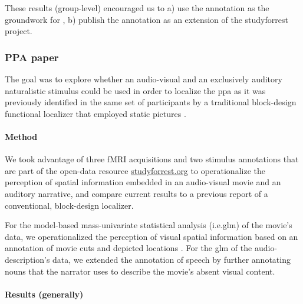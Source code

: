 These results (group-level) encouraged us to a) use the annotation as the
groundwork for \citep{haeusler2022processing}, b) publish the annotation as an
extension of the studyforrest project.


\subsubsection{PPA paper}




The goal \citep{haeusler2022processing} was to explore whether an
audio-visual and an exclusively auditory naturalistic stimulus could be used in
order to localize the \ac{ppa} as it was previously identified in the same set
of participants by a traditional block-design functional localizer that employed
static pictures \citep{sengupta2016extension}.



\paragraph{Method}

We took advantage of three fMRI acquisitions and two stimulus annotations that
are part of the open-data resource
\href{http://www.studyforrest.org}{studyforrest.org} to operationalize the
perception of spatial information embedded in an audio-visual movie and an
auditory narrative, and compare current results to a previous report of a
conventional, block-design localizer.


For the model-based mass-univariate statistical analysis (i.e.\ac{glm}) of the
movie's data, we operationalized the perception of visual spatial information
based on an annotation of movie cuts and depicted locations
\citep{haeusler2016cutanno}.
For the \ac{glm} of the audio-description's data, we extended the annotation of
speech \citep{haeusler2021speechanno} by further annotating nouns that the
narrator uses to describe the movie's absent visual content.


\paragraph{Results (generally)}

